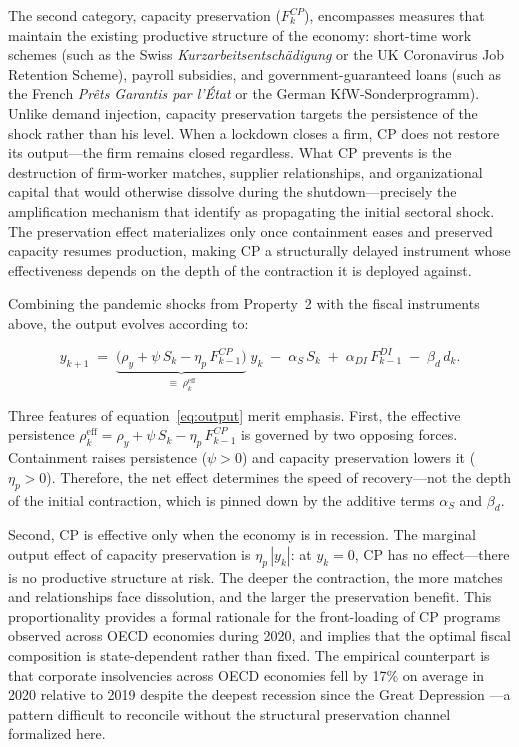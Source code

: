 \documentclass[12pt, a4paper]{article}
\begin{document}
The second category, capacity preservation ($F^{CP}_k$), encompasses measures that maintain the existing productive structure of the economy: short-time work schemes (such as the Swiss \textit{Kurzarbeitsentsch\"{a}digung} or the UK Coronavirus Job Retention Scheme), payroll subsidies, and government-guaranteed loans (such as the French \textit{Pr\^{e}ts Garantis par l'\'{E}tat} or the German KfW-Sonderprogramm). Unlike demand injection, capacity preservation targets the persistence of the shock rather than his level. When a lockdown closes a firm, CP does not restore its output---the firm remains closed regardless. What CP prevents is the destruction of firm-worker matches, supplier relationships, and organizational capital that would otherwise dissolve during the shutdown---precisely the amplification mechanism that \citet{guerrieri2022} identify as propagating the initial sectoral shock. The preservation effect materializes only once containment eases and preserved capacity resumes production, making CP a structurally delayed instrument whose effectiveness depends on the depth of the contraction it is deployed against.

Combining the pandemic shocks from Property~2 with the fiscal instruments above, the output evolves according to:

\begin{equation}\label{eq:output}
    y_{k+1} \;=\; \underbrace{\bigl(\rho_y + \psi\, S_k - \eta_p\, F^{CP}_{k-1}\bigr)}_{\equiv\;\rho^{\text{eff}}_k}\; y_k
    \;-\; \alpha_S\, S_k
    \;+\; \alpha_{\textit{DI}}\, F^{DI}_{k-1}
    \;-\; \beta_d\, d_k.
\end{equation}

\noindent Three features of equation~\eqref{eq:output} merit emphasis. 
First, the effective persistence $\rho^{\text{eff}}_k = \rho_y + \psi\, S_k - \eta_p\, F^{CP}_{k-1}$ is governed by two opposing forces. Containment raises persistence ($\psi > 0$) and capacity preservation lowers it ($\eta_p > 0$). Therefore, the net effect determines the speed of recovery---not the depth of the initial contraction, which is pinned down by the additive terms $\alpha_S$ and $\beta_d$.

Second, CP is effective only when the economy is in recession. The marginal output effect of capacity preservation is $\eta_p\,|y_k|$: at $y_k = 0$, CP has no effect---there is no productive structure at risk. The deeper the contraction, the more matches and relationships face dissolution, and the larger the preservation benefit. This proportionality provides a formal rationale for the front-loading of CP programs observed across OECD economies during 2020, and implies that the optimal fiscal composition is state-dependent rather than fixed. The empirical counterpart is that corporate insolvencies across OECD economies fell by 17\% on average in 2020 relative to 2019 despite the deepest recession since the Great Depression \citep{djankov2021, banerjee2021}---a pattern difficult to reconcile without the structural preservation channel formalized here.
\end{document}
